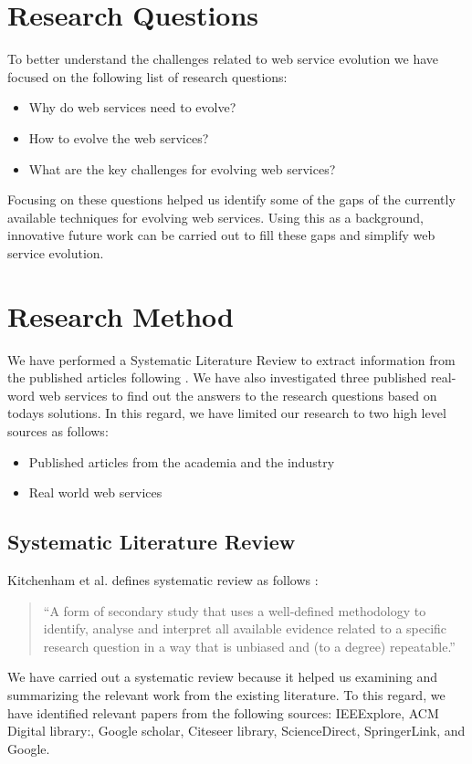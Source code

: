 \documentclass[runningheads,a4paper]{llncs}
\begin{document}

\section{Research Questions} %
\label{sec:research_questions}
To better understand the challenges related to web service evolution we have focused on the following list of research questions:

\begin{itemize}
  \item Why do web services need to evolve?
  \item How to evolve the web services?
  \item What are the key challenges for evolving web services?
\end{itemize}

Focusing on these questions helped us identify some of the gaps of the currently available techniques for evolving web services. Using this as a background, innovative future work can be carried out to fill these gaps and simplify web service evolution.

\section{Research Method} %
\label{sec:research_method}

We have performed a Systematic Literature Review to extract information from the published articles following \cite{kitchenham2007guidelines}. We have also investigated three published real-word web services to find out the answers to the research questions based on todays solutions.
In this regard, we have limited our research to two high level sources as follows:

\begin{itemize}
  \item Published articles from the academia and the industry
  \item Real world web services
\end{itemize}

\subsection{Systematic Literature Review} %
\label{sub:systematic_literature_review}
Kitchenham et al. defines systematic review as follows \cite{kitchenham2007guidelines}:

\begin{quote}
``A form of secondary study that uses a well-defined methodology to identify, analyse and interpret all available evidence related to a specific research question in a way that is unbiased and (to a degree) repeatable.''
\end{quote}
We have carried out a systematic review because it helped us examining and summarizing the relevant work from the existing literature. To this regard, we have identified relevant papers from the following sources: IEEExplore, ACM Digital library:, Google scholar, Citeseer library, ScienceDirect, SpringerLink, and Google.
\end{document}
